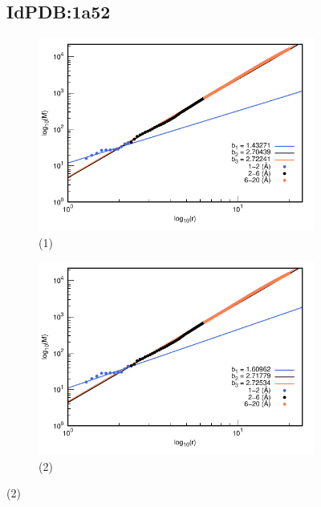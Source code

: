 		\begin{figure}[H]
			\subsection*{IdPDB:1a52}
			
			\hspace{-0.3cm} 
			\begin{subfigure}{0.49\textwidth}
				\centering
				\includegraphics[width=\linewidth,page=1]{graphs/PDBs/1a52/1a52addH.pdf}
				\caption{(1)}
			\end{subfigure}
			\hspace{0.2cm}
			\begin{subfigure}{0.49\textwidth}
				\centering
				\includegraphics[width=\linewidth,page=1]{graphs/PDBs/1a52/1a52Em.pdf}
				\caption{(2)}
			\end{subfigure}
			

\end{figure}
